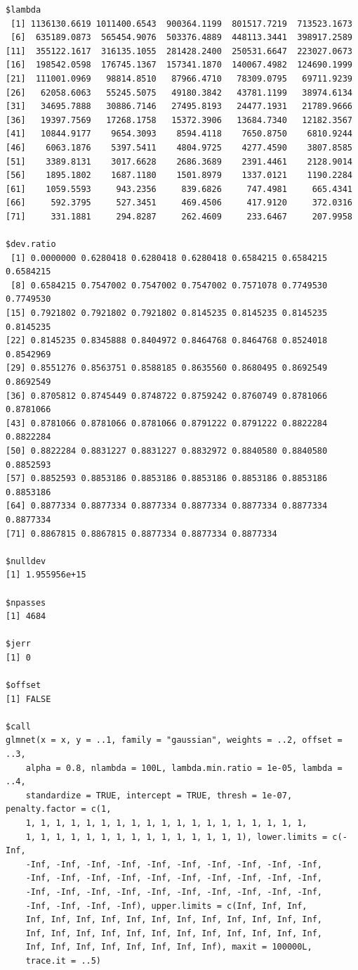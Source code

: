 \documentclass[
]{article}
\begin{document}
\begin{verbatim}
$lambda
 [1] 1136130.6619 1011400.6543  900364.1199  801517.7219  713523.1673
 [6]  635189.0873  565454.9076  503376.4889  448113.3441  398917.2589
[11]  355122.1617  316135.1055  281428.2400  250531.6647  223027.0673
[16]  198542.0598  176745.1367  157341.1870  140067.4982  124690.1999
[21]  111001.0969   98814.8510   87966.4710   78309.0795   69711.9239
[26]   62058.6063   55245.5075   49180.3842   43781.1199   38974.6134
[31]   34695.7888   30886.7146   27495.8193   24477.1931   21789.9666
[36]   19397.7569   17268.1758   15372.3906   13684.7340   12182.3567
[41]   10844.9177    9654.3093    8594.4118    7650.8750    6810.9244
[46]    6063.1876    5397.5411    4804.9725    4277.4590    3807.8585
[51]    3389.8131    3017.6628    2686.3689    2391.4461    2128.9014
[56]    1895.1802    1687.1180    1501.8979    1337.0121    1190.2284
[61]    1059.5593     943.2356     839.6826     747.4981     665.4341
[66]     592.3795     527.3451     469.4506     417.9120     372.0316
[71]     331.1881     294.8287     262.4609     233.6467     207.9958

$dev.ratio
 [1] 0.0000000 0.6280418 0.6280418 0.6280418 0.6584215 0.6584215 0.6584215
 [8] 0.6584215 0.7547002 0.7547002 0.7547002 0.7571078 0.7749530 0.7749530
[15] 0.7921802 0.7921802 0.7921802 0.8145235 0.8145235 0.8145235 0.8145235
[22] 0.8145235 0.8345888 0.8404972 0.8464768 0.8464768 0.8524018 0.8542969
[29] 0.8551276 0.8563751 0.8588185 0.8635560 0.8680495 0.8692549 0.8692549
[36] 0.8705812 0.8745449 0.8748722 0.8759242 0.8760749 0.8781066 0.8781066
[43] 0.8781066 0.8781066 0.8781066 0.8791222 0.8791222 0.8822284 0.8822284
[50] 0.8822284 0.8831227 0.8831227 0.8832972 0.8840580 0.8840580 0.8852593
[57] 0.8852593 0.8853186 0.8853186 0.8853186 0.8853186 0.8853186 0.8853186
[64] 0.8877334 0.8877334 0.8877334 0.8877334 0.8877334 0.8877334 0.8877334
[71] 0.8867815 0.8867815 0.8877334 0.8877334 0.8877334

$nulldev
[1] 1.955956e+15

$npasses
[1] 4684

$jerr
[1] 0

$offset
[1] FALSE

$call
glmnet(x = x, y = ..1, family = "gaussian", weights = ..2, offset = ..3, 
    alpha = 0.8, nlambda = 100L, lambda.min.ratio = 1e-05, lambda = ..4, 
    standardize = TRUE, intercept = TRUE, thresh = 1e-07, penalty.factor = c(1, 
    1, 1, 1, 1, 1, 1, 1, 1, 1, 1, 1, 1, 1, 1, 1, 1, 1, 1, 1, 
    1, 1, 1, 1, 1, 1, 1, 1, 1, 1, 1, 1, 1, 1, 1), lower.limits = c(-Inf, 
    -Inf, -Inf, -Inf, -Inf, -Inf, -Inf, -Inf, -Inf, -Inf, -Inf, 
    -Inf, -Inf, -Inf, -Inf, -Inf, -Inf, -Inf, -Inf, -Inf, -Inf, 
    -Inf, -Inf, -Inf, -Inf, -Inf, -Inf, -Inf, -Inf, -Inf, -Inf, 
    -Inf, -Inf, -Inf, -Inf), upper.limits = c(Inf, Inf, Inf, 
    Inf, Inf, Inf, Inf, Inf, Inf, Inf, Inf, Inf, Inf, Inf, Inf, 
    Inf, Inf, Inf, Inf, Inf, Inf, Inf, Inf, Inf, Inf, Inf, Inf, 
    Inf, Inf, Inf, Inf, Inf, Inf, Inf, Inf), maxit = 100000L, 
    trace.it = ..5)


\end{verbatim}
\end{document}
